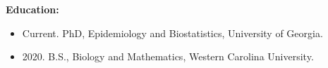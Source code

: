 \textbf{Education:}

\begin{itemize}
\item Current. PhD, Epidemiology and Biostatistics, University of Georgia.
\item 2020. B.S., Biology and Mathematics, Western Carolina University.
\end{itemize}